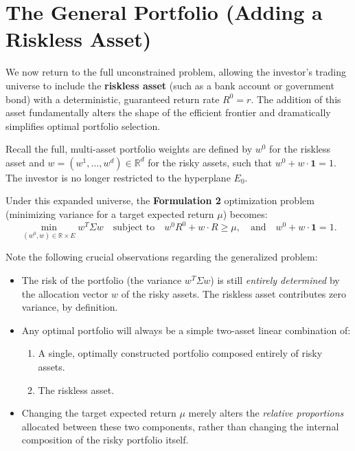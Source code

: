 \chapter{The General Portfolio (Adding a Riskless Asset)}

We now return to the full unconstrained problem, allowing the investor's trading universe to include the \textbf{riskless asset} (such as a bank account or government bond) with a deterministic, guaranteed return rate $R^0 = r$. The addition of this asset fundamentally alters the shape of the efficient frontier and dramatically simplifies optimal portfolio selection.

Recall the full, multi-asset portfolio weights are defined by $w^0$ for the riskless asset and $w = (w^1, \dots, w^d) \in \mathbb{R}^d$ for the risky assets, such that $w^0 + w \cdot \mathbf{1} = 1$. The investor is no longer restricted to the hyperplane $E_0$.

Under this expanded universe, the \textbf{Formulation 2} optimization problem (minimizing variance for a target expected return $\mu$) becomes:
\begin{equation}
    \min_{(w^0, w) \in \mathbb{R} \times E} w^T \Sigma w \quad \text{subject to} \quad w^0 R^0 + w \cdot R \ge \mu, \quad \text{and} \quad w^0 + w \cdot \mathbf{1} = 1.
\end{equation}

Note the following crucial observations regarding the generalized problem:
\begin{itemize}
    \item The risk of the portfolio (the variance $w^T \Sigma w$) is still \textit{entirely determined} by the allocation vector $w$ of the risky assets. The riskless asset contributes zero variance, by definition.
    \item Any optimal portfolio will always be a simple two-asset linear combination of:
    \begin{enumerate}
        \item A single, optimally constructed portfolio composed entirely of risky assets.
        \item The riskless asset.
    \end{enumerate}
    \item Changing the target expected return $\mu$ merely alters the \textit{relative proportions} allocated between these two components, rather than changing the internal composition of the risky portfolio itself. 
\end{itemize}

